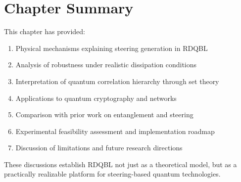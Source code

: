 \section{Chapter Summary}

This chapter has provided:
\begin{enumerate}
	\item Physical mechanisms explaining steering generation in RDQBL
	\item Analysis of robustness under realistic dissipation conditions
	\item Interpretation of quantum correlation hierarchy through set theory
	\item Applications to quantum cryptography and networks
	\item Comparison with prior work on entanglement and steering
	\item Experimental feasibility assessment and implementation roadmap
	\item Discussion of limitations and future research directions
\end{enumerate}

These discussions establish RDQBL not just as a theoretical model, but as a practically realizable platform for steering-based quantum technologies.

